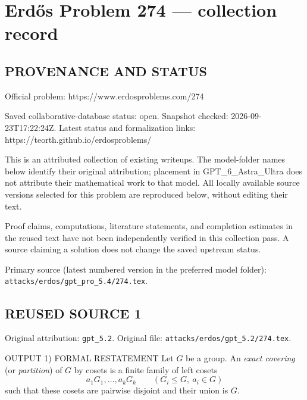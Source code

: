 \section*{Erd\H{o}s Problem 274 --- collection record}

\subsection*{PROVENANCE AND STATUS}
Official problem: https://www.erdosproblems.com/274

Saved collaborative-database status: open.
Snapshot checked: 2026-09-23T17:22:24Z.
Latest status and formalization links: https://teorth.github.io/erdosproblems/

This is an attributed collection of existing writeups. The model-folder names below identify their original attribution; placement in GPT\_6\_Astra\_Ultra does not attribute their mathematical work to that model. All locally available source versions selected for this problem are reproduced below, without editing their text.

Proof claims, computations, literature statements, and completion estimates in the reused text have not been independently verified in this collection pass. A source claiming a solution does not change the saved upstream status.

Primary source (latest numbered version in the preferred model folder): \texttt{attacks/erdos/gpt\_pro\_5.4/274.tex}.

\subsection*{REUSED SOURCE 1}
Original attribution: \texttt{gpt\_5.2}.
Original file: \texttt{attacks/erdos/gpt\_5.2/274.tex}.


OUTPUT
1) FORMAL RESTATEMENT
Let $G$ be a group. An \emph{exact covering} (or \emph{partition}) of $G$ by cosets is a finite family of left cosets
\[a_1G_1,\dots,a_kG_k\qquad (G_i\le G,\ a_i\in G)\]
such that these cosets are pairwise disjoint and their union is $G$.

